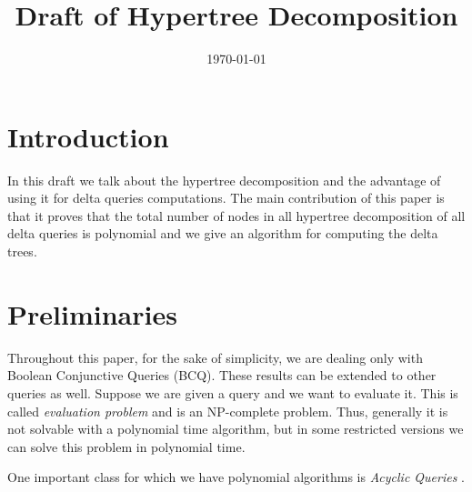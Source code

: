 \documentclass[12pt]{article}
\begin{document}
\title{Draft of Hypertree Decomposition}
\date{\today}
\maketitle
\section{Introduction}
In this draft we talk about the hypertree decomposition and the advantage of using it for delta queries computations. The main contribution of this paper is that it proves that the total number of nodes in all hypertree decomposition of all delta queries is polynomial and we give an algorithm for computing the delta trees.
\section{Preliminaries}
Throughout this paper, for the sake of simplicity, we are dealing only with Boolean Conjunctive Queries (BCQ). These results can be extended to other queries as well. Suppose we are given a query and we want to evaluate it. This is called \emph{evaluation problem} and is an NP-complete problem\cite{1}. Thus, generally it is not solvable with a polynomial time algorithm, but in some restricted versions we can solve this problem in polynomial time. \par

One important class for which we have polynomial algorithms is \emph{Acyclic Queries} \cite{1}. 
\end{document}
